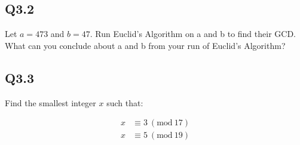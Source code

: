 \documentclass{article}
\begin{document}
\subsection*{Q3.2}
Let $a = 473$ and $b = 47$. Run Euclid's Algorithm on a and b to find their GCD. What can you conclude about a and b from your run of Euclid's Algorithm?
\newpage

\subsection*{Q3.3}
Find the smallest integer $x$ such that:

\begin{align*}
x &\equiv 3 \ (\text{mod}\ 17) \\
x &\equiv 5 \ (\text{mod}\ 19)
\end{align*}

\newpage



\end{document}
